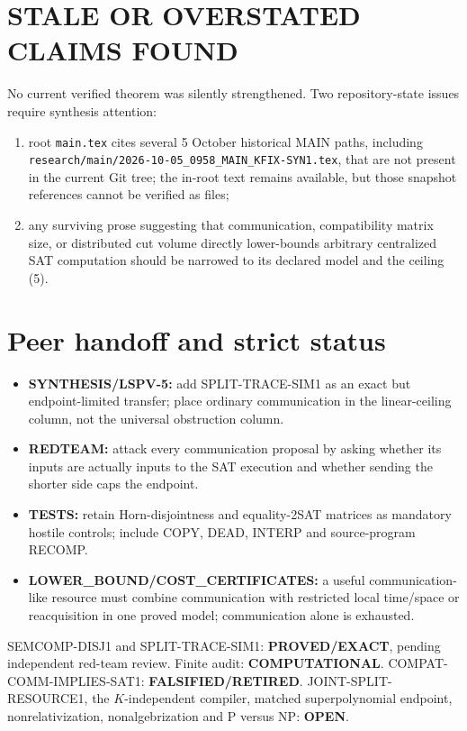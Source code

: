 \documentclass[11pt]{article}
\begin{document}
\section{STALE OR OVERSTATED CLAIMS FOUND}
No current verified theorem was silently strengthened.  Two repository-state
issues require synthesis attention:
\begin{enumerate}[leftmargin=*]
\item root \texttt{main.tex} cites several 5 October historical MAIN paths,
including \texttt{research/main/2026-10-05\_0958\_MAIN\_KFIX-SYN1.tex},
that are not present in the current Git tree; the in-root text remains
available, but those snapshot references cannot be verified as files;
\item any surviving prose suggesting that communication, compatibility
matrix size, or distributed cut volume directly lower-bounds arbitrary
centralized SAT computation should be narrowed to its declared model and the
ceiling (5).
\end{enumerate}

\section{Peer handoff and strict status}
\begin{itemize}[leftmargin=*]
\item \textbf{SYNTHESIS/LSPV-5:} add SPLIT-TRACE-SIM1 as an exact but
endpoint-limited transfer; place ordinary communication in the linear-ceiling
column, not the universal obstruction column.
\item \textbf{REDTEAM:} attack every communication proposal by asking whether
its inputs are actually inputs to the SAT execution and whether sending the
shorter side caps the endpoint.
\item \textbf{TESTS:} retain Horn-disjointness and equality-2SAT matrices as
mandatory hostile controls; include COPY, DEAD, INTERP and source-program
RECOMP.
\item \textbf{LOWER\_BOUND/COST\_CERTIFICATES:} a useful communication-like
resource must combine communication with restricted local time/space or
reacquisition in one proved model; communication alone is exhausted.
\end{itemize}

\textsf{SEMCOMP-DISJ1} and \textsf{SPLIT-TRACE-SIM1}:
\textbf{PROVED/EXACT}, pending independent red-team review.
Finite audit: \textbf{COMPUTATIONAL}.
\textsf{COMPAT-COMM-IMPLIES-SAT1}: \textbf{FALSIFIED/RETIRED}.
\textsf{JOINT-SPLIT-RESOURCE1}, the $K$-independent compiler, matched
superpolynomial endpoint, nonrelativization, nonalgebrization and P versus NP:
\textbf{OPEN}.

\end{document}
